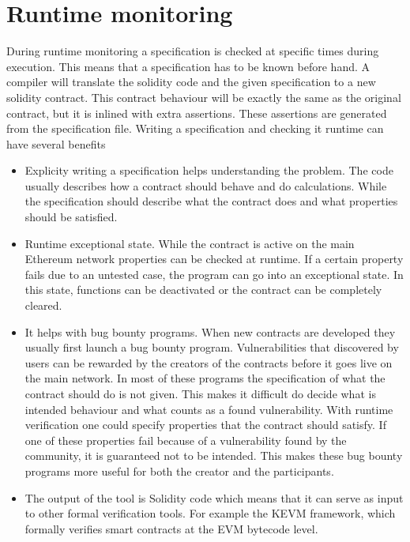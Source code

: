\documentclass[a4paper]{article}
\begin{document}
\section{Runtime monitoring}
 During runtime monitoring a specification is checked at specific times during execution. This means that a specification has to be known before hand. A compiler will translate the solidity code and the given specification to a new solidity contract. This contract behaviour will be exactly the same as the original contract, but it is inlined with extra assertions. These assertions are generated from the specification file. Writing a specification and checking it runtime can have several benefits
\begin{itemize}
\item Explicity writing a specification helps understanding the problem. The code usually describes how a contract should behave and do calculations. While the specification should describe what the contract does and what properties should be satisfied.
\item Runtime exceptional state. While the contract is active on the main Ethereum network properties can be checked at runtime. If a certain property fails due to an untested case, the program can go into an exceptional state. In this state, functions can be deactivated or the contract can be completely cleared. 
\item It helps with bug bounty programs. When new contracts are developed they usually first launch a bug bounty program. Vulnerabilities that discovered by users can be rewarded by the creators of the contracts before it goes live on the main network. In most of these programs the specification of what the contract should do is not given. This makes it difficult do decide what is intended behaviour and what counts as a found vulnerability. With runtime verification one could specify properties that the contract should satisfy. If one of these properties fail because of a vulnerability found by the community, it is guaranteed not to be intended. This makes these bug bounty programs more useful for both the creator and the participants. 
\item  The output of the tool is Solidity code which means that it can serve as input to other formal verification tools. For example the KEVM framework, which formally verifies smart contracts at the EVM bytecode level. 
\end{itemize}
\end{document}
